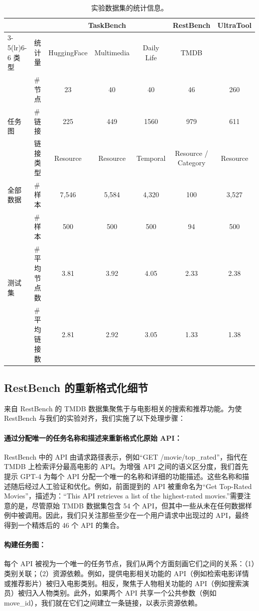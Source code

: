 \documentclass[11pt,UTF8,fontset=fandol]{ctexart}
\begin{document}
\begin{table}[H]\centering
\caption{实验数据集的统计信息。}
\label{tab:7}
\small
\setlength{\tabcolsep}{5pt}
\begin{tabular}{llccccc}
\toprule
& & \multicolumn{3}{c}{TaskBench} & \multicolumn{1}{c}{RestBench} & \multirow{2}{*}{UltraTool}\\
\cmidrule(lr){3-5}\cmidrule(lr){6-6}
类型 & 统计量 & HuggingFace & Multimedia & Daily Life & TMDB & \\
\midrule
\multirow{3}{*}{任务图}
& \# 节点 & 23 & 40 & 40 & 46 & 260\\
& \# 链接 & 225 & 449 & 1560 & 979 & 611\\
& 链接类型 & Resource & Resource & Temporal & Resource / Category & Resource\\
\midrule
全部数据 & \# 样本 & 7{,}546 & 5{,}584 & 4{,}320 & 100 & 3{,}527\\
\midrule
\multirow{3}{*}{测试集}
& \# 样本 & 500 & 500 & 500 & 94 & 500\\
& \# 平均节点数 & 3.81 & 3.92 & 4.05 & 2.33 & 2.38\\
& \# 平均链接数 & 2.81 & 2.92 & 3.05 & 1.33 & 1.38\\
\bottomrule
\end{tabular}
\end{table}

\subsection{RestBench 的重新格式化细节}

来自 RestBench 的 TMDB 数据集聚焦于与电影相关的搜索和推荐功能。为使 RestBench 与我们的实验对齐，我们实施了以下处理步骤：

\paragraph{通过分配唯一的任务名称和描述来重新格式化原始 API：}RestBench 中的 API 由请求路径表示，例如“GET /movie/top\_rated”，指代在 TMDB 上检索评分最高电影的 API。为增强 API 之间的语义区分度，我们首先提示 GPT-4 为每个 API 分配一个唯一的名称和详细的功能描述。这些名称和描述随后经过人工验证和优化。例如，前面提到的 API 被重命名为“Get Top-Rated Movies”，描述为：“This API retrieves a list of the highest-rated movies.”需要注意的是，尽管原始 TMDB 数据集包含 54 个 API，但其中一些从未在任何数据样例中被调用。因此，我们只关注那些至少在一个用户请求中出现过的 API，最终得到一个精炼后的 46 个 API 的集合。

\paragraph{构建任务图：}每个 API 被视为一个唯一的任务节点，我们从两个方面刻画它们之间的关系：（1）类别关联；（2）资源依赖。例如，提供电影相关功能的 API（例如检索电影详情或推荐影片）被归入电影类别。相反，聚焦于人物相关功能的 API（例如搜索演员）被归入人物类别。此外，如果两个 API 共享一个公共参数（例如 move\_id），我们就在它们之间建立一条链接，以表示资源依赖。
\end{document}
